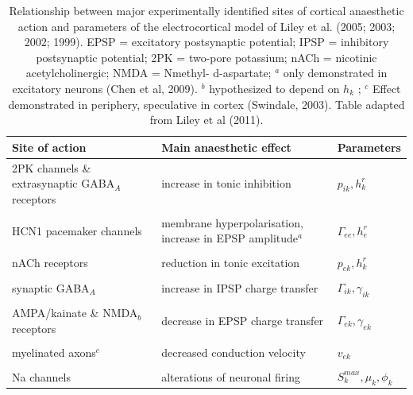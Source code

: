 \documentclass[a4paper,12pt]{article}
\begin{document}
\begin{table}[h]
\label{table:site_of_action} 
\begin{tabular}{p{5cm} p{5cm} l}
\hline 
 Site of action & Main anaesthetic effect & Parameters \\
\hline
2PK channels \& extrasynaptic GABA$_A$ receptors & increase in tonic inhibition & $p_{ik}, h_k^r$ \\
\\
HCN1 pacemaker channels & membrane hyperpolarisation, increase in EPSP amplitude$^a$ & $\Gamma_{ee}, h_e^r$\\
\\
nACh receptors & reduction in tonic excitation & $p_{ek}, h_k^r$ \\
\\
synaptic GABA$_A$ & increase in IPSP charge transfer & $\Gamma_{ik}, \gamma_{ik}$\\
\\
AMPA/kainate \& NMDA$_b$ receptors & decrease in EPSP charge transfer & $\Gamma_{ek}, \gamma_{ek}$\\
\\
myelinated axons$^c$ & decreased conduction velocity & $v_{ek}$\\
\\
Na channels & alterations of neuronal firing & $S_k^{max}, \mu_k, \phi_k$\\
\hline
\end{tabular}
\caption{Relationship between major experimentally identified sites of
cortical anaesthetic action and parameters of the electrocortical model
of Liley et al. (2005; 2003; 2002; 1999). EPSP = excitatory
postsynaptic potential; IPSP = inhibitory postsynaptic potential; 2PK =
two-pore potassium; nACh = nicotinic acetylcholinergic; NMDA = Nmethyl-
d-aspartate; $^a$ only demonstrated in excitatory neurons (Chen
et al, 2009). $^b$ hypothesized to depend on $h_k$ ; $^c$ Effect demonstrated
in periphery, speculative in cortex (Swindale, 2003). Table adapted
from Liley et al (2011).}
\end{table}
\end{document}
